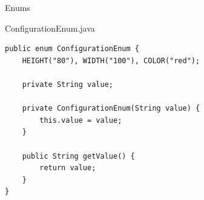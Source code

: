\begin{frame}[fragile]{Enums}
	\begin{exampleblock}{ConfigurationEnum.java}
		\begin{lstlisting}
public enum ConfigurationEnum {
	HEIGHT("80"), WIDTH("100"), COLOR("red");
	
	private String value;
	
	private ConfigurationEnum(String value) {
		this.value = value;
	}
	
	public String getValue() {
		return value;
	}
}    
		\end{lstlisting}
 	\end{exampleblock}
\end{frame}

